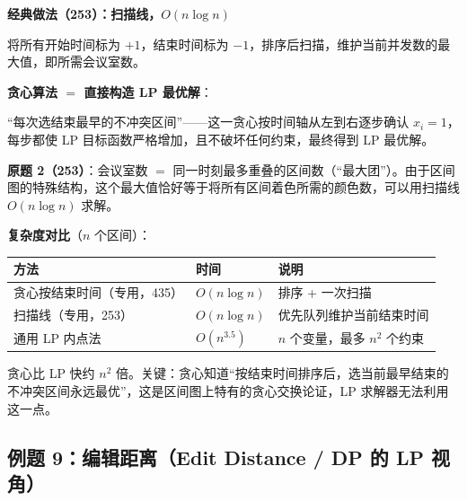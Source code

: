 \documentclass[12pt, a4paper]{ctexart}
\begin{document}
\begin{blackboard}
\textbf{经典做法（253）：扫描线，$O(n\log n)$}

将所有开始时间标为 $+1$，结束时间标为 $-1$，排序后扫描，维护当前并发数的最大值，即所需会议室数。

\textbf{贪心算法 $=$ 直接构造 LP 最优解}：

``每次选结束最早的不冲突区间''——这一贪心按时间轴从左到右逐步确认 $x_i = 1$，每步都使 LP 目标函数严格增加，且不破坏任何约束，最终得到 LP 最优解。

\textbf{原题 2（253）}：会议室数 $=$ 同一时刻最多重叠的区间数（``最大团''）。由于区间图的特殊结构，这个最大值恰好等于将所有区间着色所需的颜色数，可以用扫描线 $O(n\log n)$ 求解。

\textbf{复杂度对比}（$n$ 个区间）：

\begin{center}
\begin{tabular}{lll}
\toprule
方法 & 时间 & 说明 \\
\midrule
贪心按结束时间（专用，435） & $O(n\log n)$ & 排序 + 一次扫描 \\
扫描线（专用，253） & $O(n\log n)$ & 优先队列维护当前结束时间 \\
通用 LP 内点法 & $O(n^{3.5})$ & $n$ 个变量，最多 $n^2$ 个约束 \\
\bottomrule
\end{tabular}
\end{center}

贪心比 LP 快约 $n^{2}$ 倍。关键：贪心知道``按结束时间排序后，选当前最早结束的不冲突区间永远最优''，这是区间图上特有的贪心交换论证，LP 求解器无法利用这一点。

\end{blackboard}

\subsection{例题 9：编辑距离（Edit Distance / DP 的 LP 视角）}
\end{document}
